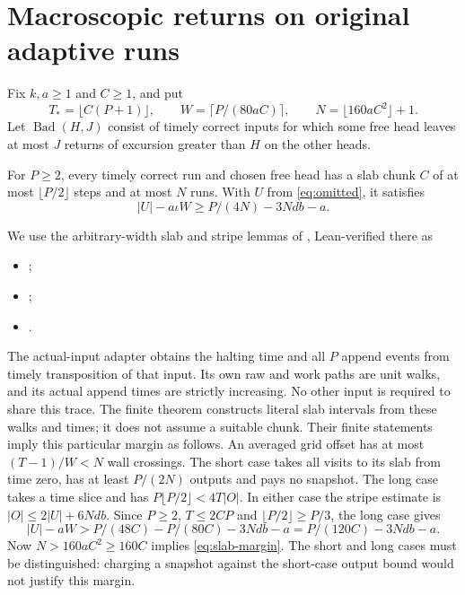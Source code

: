 \section{Macroscopic returns on original adaptive runs}\label{sec:returns}

Fix $k,a\ge1$ and $C\ge1$, and put
\[
 T_* =\lfloor C(P+1)\rfloor,\qquad W=\lceil P/(80aC)\rceil,
 \qquad N=\lfloor160aC^2\rfloor+1.
\]
Let $\operatorname{Bad}(H,J)$ consist of timely correct inputs for which some
free head leaves at most $J$ returns of excursion greater than $H$ on the
other heads.

\begin{lemma}\label{lem:slab-geometry}
For $P\ge2$, every timely correct run and chosen free head has a slab chunk $C$
of at most $\lfloor P/2\rfloor$ steps and at most $N$ runs. With $U$ from
\cref{eq:omitted}, it satisfies
\begin{equation}\label{eq:slab-margin}
 |U|-a\iota W\ge P/(4N)-3Ndb-a.
\end{equation}
\end{lemma}
\begin{outline}
We use the arbitrary-width slab and stripe lemmas of
\cite{MacroscopicCrossings2026}, Lean-verified there as
\begin{itemize}[nosep]
\item {};
\item {};
\item {}.
\end{itemize}
The actual-input adapter obtains the halting time and all $P$ append events
from timely transposition of that input. Its own raw and work paths are unit
walks, and its actual append times are strictly increasing. No other input
is required to share this trace. The finite theorem constructs literal slab
intervals from these walks and times; it does not assume a suitable chunk.
Their finite statements imply this particular margin as follows.
An averaged grid offset has at most $(T-1)/W<N$ wall crossings. The short
case takes all visits to its slab from time zero, has at least $P/(2N)$
outputs and pays no snapshot. The long case takes a time slice and has
$P\lfloor P/2\rfloor<4T|O|$. In either case the stripe estimate is
$|O|\le2|U|+6Ndb$. Since $P\ge2$, $T\le2CP$ and
$\lfloor P/2\rfloor\ge P/3$, the long case gives
\[
 |U|-aW>P/(48C)-P/(80C)-3Ndb-a
       =P/(120C)-3Ndb-a.
\]
Now $N>160aC^2\ge160C$ implies \cref{eq:slab-margin}. The short and long
cases must be distinguished: charging a snapshot against the short-case
output bound would not justify this margin.
\end{outline}

